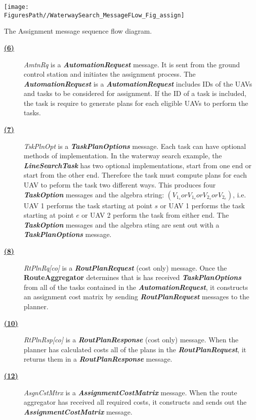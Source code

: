 \begin{marginfigure}
	\texttt{[image: \\FiguresPath//WaterwaySearch\_MessageFLow\_Fig\_assign]}
	\caption{The Assignment message sequence flow diagram.}
	\label{fig:MessageFlow_assign}
\end{marginfigure}
\begin{description}
	\item[\hyperlink{msg:06.AutomationRequest}{\textbf{(6)}}]  \textit{AmtnRq} is a \textbf{\textit{AutomationRequest}} message. It is sent from the ground control station and initiates the assignment process. The \textbf{\textit{AutomationRequest}} is a \textbf{\textit{AutomationRequest}} includes IDs of the UAVs and tasks to be considered for assignment. If the ID of a task is included, the task is require to generate plans for each eligible UAVs to perform the tasks. 
	\item[\hyperlink{msg:07.TaskPlanOptions}{\textbf{(7)}}]  \textit{TskPlnOpt} is a \textbf{\textit{TaskPlanOptions}} message. Each task can have optional methods of implementation. In the waterway search example, the \textbf{\textit{LineSearchTask}} has two optional implementations, start from one end or start from the other end. Therefore the task must compute plans for each UAV to peform the task two different ways. This produces four \textbf{\textit{TaskOption}} messages and the algebra string: $(V_{1_s} or V_{1_e} or V_{2_s} or V_{2_e})$, i.e. UAV 1 performs the task starting at point $s$ or  UAV 1 performs the task starting at point $e$ or UAV 2 perform the task from either end. The \textbf{\textit{TaskOption}} messages and the algebra sting are sent out with a \textbf{\textit{TaskPlanOptions}} message.
	\item[\hyperlink{msg:08.RoutePlanRequest.400}{\textbf{(8)}}]  \textit{RtPlnRq[co]} is a \textbf{\textit{RoutPlanRequest}} (cost only) message. Once the \textbf{RouteAggregator} determines that is has received \textbf{\textit{TaskPlanOptions}} from all of the tasks contained in the \textbf{\textit{AutomationRequest}}, it constructs an assignment cost matrix by sending \textbf{\textit{RoutPlanRequest}} messages to the planner.
	\item[\hyperlink{msg:10.RoutePlanResponse.400}{\textbf{(10)}}]  \textit{RtPlnRsp[co]} is a \textbf{\textit{RoutPlanResponse}} (cost only) message. When the planner has calculated costs all of the plans in the \textbf{\textit{RoutPlanRequest}}, it returns them in a \textbf{\textit{RoutPlanResponse}} message.
	\item[\hyperlink{msg:12.AssignmentCostMatrix}{\textbf{(12)}}]  \textit{AsgnCstMtrx} is a \textbf{\textit{AssignmentCostMatrix}} message. When the route aggregator has received all required costs, it constructs and sends out the \textbf{\textit{AssignmentCostMatrix}} message.

\end{description}
